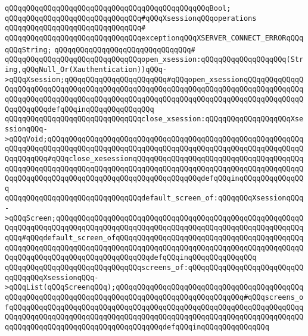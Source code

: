 \verb|qQQqqQQqqQQqqQQqqQQqqQQqqQQqqQQqqQQqqQQqqQQqqQQqBool;|\newline
\newline
\newline
\verb|qQQqqQQqqQQqqQQqqQQqqQQqqQQqqQQq#qQQqXsessionqQQqoperations|\newline
\verb|qQQqqQQqqQQqqQQqqQQqqQQqqQQqqQQq#|\newline
\verb|qQQqqQQqqQQqqQQqqQQqqQQqqQQqqQQqexceptionqQQqXSERVER_CONNECT_ERRORqQQqqQQqString;|\newline
\verb|qQQqqQQqqQQqqQQqqQQqqQQqqQQqqQQq#|\newline
\verb|qQQqqQQqqQQqqQQqqQQqqQQqqQQqqQQqopen_xsession:qQQqqQQqqQQqqQQqqQQq(String,qQQqNull_Or(Xauthentication))qQQq->qQQqXsession;qQQqqQQqqQQqqQQqqQQqqQQq#qQQqopen_xsessionqQQqqQQqqQQqqQQqqQQqqQQqqQQqqQQqqQQqqQQqqQQqqQQqqQQqqQQqqQQqqQQqqQQqqQQqqQQqqQQqqQQqqQQqqQQqqQQqqQQqqQQqqQQqqQQqqQQqqQQqqQQqqQQqqQQqqQQqqQQqqQQqqQQqqQQqqQQqqQQqqQQqdefqQQqinqQQqqQQqqQQqqQQq|\newline
\verb|qQQqqQQqqQQqqQQqqQQqqQQqqQQqqQQqclose_xsession:qQQqqQQqqQQqqQQqqQQqXsessionqQQq->qQQqVoid;qQQqqQQqqQQqqQQqqQQqqQQqqQQqqQQqqQQqqQQqqQQqqQQqqQQqqQQqqQQqqQQqqQQqqQQqqQQqqQQqqQQqqQQqqQQqqQQqqQQqqQQqqQQqqQQqqQQqqQQqqQQqqQQqqQQqqQQqqQQq#qQQqclose_xesessionqQQqqQQqqQQqqQQqqQQqqQQqqQQqqQQqqQQqqQQqqQQqqQQqqQQqqQQqqQQqqQQqqQQqqQQqqQQqqQQqqQQqqQQqqQQqqQQqqQQqqQQqqQQqqQQqqQQqqQQqqQQqqQQqqQQqqQQqqQQqqQQqqQQqqQQqqQQqdefqQQqinqQQqqQQqqQQqqQQq|\newline
\verb|qQQqqQQqqQQqqQQqqQQqqQQqqQQqqQQqdefault_screen_of:qQQqqQQqXsessionqQQq->qQQqScreen;qQQqqQQqqQQqqQQqqQQqqQQqqQQqqQQqqQQqqQQqqQQqqQQqqQQqqQQqqQQqqQQqqQQqqQQqqQQqqQQqqQQqqQQqqQQqqQQqqQQqqQQqqQQqqQQqqQQqqQQqqQQqqQQqqQQq#qQQqdefault_screen_ofqQQqqQQqqQQqqQQqqQQqqQQqqQQqqQQqqQQqqQQqqQQqqQQqqQQqqQQqqQQqqQQqqQQqqQQqqQQqqQQqqQQqqQQqqQQqqQQqqQQqqQQqqQQqqQQqqQQqqQQqqQQqqQQqqQQqqQQqqQQqqQQqqQQqdefqQQqinqQQqqQQqqQQqqQQq|\newline
\verb|qQQqqQQqqQQqqQQqqQQqqQQqqQQqqQQqscreens_of:qQQqqQQqqQQqqQQqqQQqqQQqqQQqqQQqqQQqXsessionqQQq->qQQqList(qQQqScreenqQQq);qQQqqQQqqQQqqQQqqQQqqQQqqQQqqQQqqQQqqQQqqQQqqQQqqQQqqQQqqQQqqQQqqQQqqQQqqQQqqQQqqQQqqQQqqQQqqQQqqQQq#qQQqscreens_ofqQQqqQQqqQQqqQQqqQQqqQQqqQQqqQQqqQQqqQQqqQQqqQQqqQQqqQQqqQQqqQQqqQQqqQQqqQQqqQQqqQQqqQQqqQQqqQQqqQQqqQQqqQQqqQQqqQQqqQQqqQQqqQQqqQQqqQQqqQQqqQQqqQQqqQQqqQQqqQQqqQQqqQQqqQQqqQQqdefqQQqinqQQqqQQqqQQqqQQq|\newline
